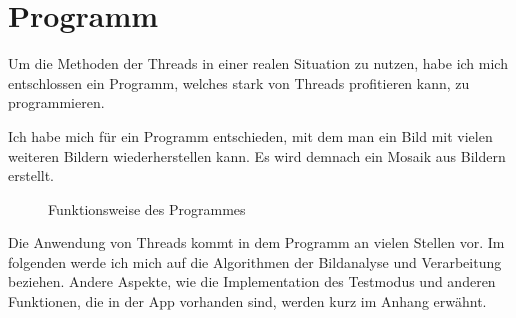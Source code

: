 \section{Programm}\label{Programm}
Um die Methoden der Threads in einer realen Situation zu nutzen, habe ich mich entschlossen ein Programm, welches stark von Threads profitieren kann, zu programmieren.  

Ich habe mich für ein Programm entschieden, mit dem man ein Bild mit vielen weiteren Bildern wiederherstellen kann. Es wird demnach ein Mosaik aus Bildern erstellt.

\begin{figure}[h]
    \centering
    \caption[Programm Funktion]{Funktionsweise des Programmes}
\end{figure}

Die Anwendung von Threads kommt in dem Programm an vielen Stellen vor. Im folgenden werde ich mich auf die Algorithmen der Bildanalyse und Verarbeitung beziehen. Andere Aspekte, wie die Implementation des Testmodus und anderen Funktionen, die in der App vorhanden sind, werden kurz im Anhang erwähnt.